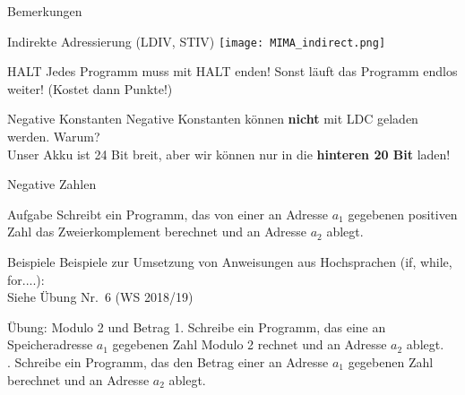 \begin{frame}{Bemerkungen}
	\begin{block}{Indirekte Adressierung (LDIV, STIV)}
		\centering
		\texttt{[image: MIMA\_indirect.png]}
	\end{block}
	
	\pause
	\begin{block}{HALT}
		Jedes Programm muss mit HALT enden! Sonst läuft das Programm endlos weiter! (Kostet dann Punkte!)
	\end{block}

	\pause
	\begin{block}{Negative Konstanten}
		Negative Konstanten können \textbf{nicht} mit LDC geladen werden. Warum? \\
		\pause \impl Unser Akku ist 24 Bit breit, aber wir können nur in die \textbf{hinteren 20 Bit} laden!
	\end{block}
\end{frame}

\begin{frame}{Negative Zahlen}
	\begin{block}{Aufgabe}
		Schreibt ein Programm, das von einer an Adresse $a_1$ gegebenen positiven Zahl das Zweierkomplement berechnet und an Adresse $a_2$ ablegt.
	\end{block}

\end{frame}

\begin{frame}{Beispiele}
	Beispiele zur Umsetzung von Anweisungen aus Hochsprachen (if, while, for....):\\
	\bigskip
	Siehe Übung Nr.~6 (WS 2018/19)
\end{frame}

\begin{frame}{Übung: Modulo 2 und Betrag}
	1. Schreibe ein Programm, das eine an Speicheradresse $a_1$ gegebenen Zahl Modulo 2 rechnet und an Adresse $a_2$ ablegt. \\
	. Schreibe ein Programm, das den Betrag einer an Adresse $a_1$ gegebenen Zahl berechnet und an Adresse $a_2$ ablegt.
\end{frame}


